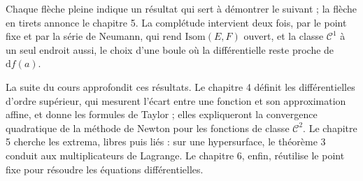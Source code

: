 \documentclass[a4paper,twoside]{report}
\newcommand{\dd}{\mathrm{d}}                      %
\newcommand{\Cc}{\mathcal{C}}                     %
\newcommand{\Isom}{\mathrm{Isom}}                 %
\begin{document}
\begin{center}
\end{center}

\noindent Chaque flèche pleine indique un résultat qui sert à démontrer le suivant ; la flèche en tirets annonce le chapitre 5. La complétude intervient deux fois, par le point fixe et par la série de Neumann, qui rend $\Isom(E, F)$ ouvert, et la classe $\Cc^{1}$ à un seul endroit aussi, le choix d'une boule où la différentielle reste proche de $\dd f(a)$.

La suite du cours approfondit ces résultats. Le chapitre 4 définit les différentielles d'ordre supérieur, qui mesurent l'écart entre une fonction et son approximation affine, et donne les formules de Taylor ; elles expliqueront la convergence quadratique de la méthode de Newton pour les fonctions de classe $\Cc^{2}$. Le chapitre 5 cherche les extrema, libres puis liés : sur une hypersurface, le théorème 3 conduit aux multiplicateurs de Lagrange. Le chapitre 6, enfin, réutilise le point fixe pour résoudre les équations différentielles.
\end{document}
